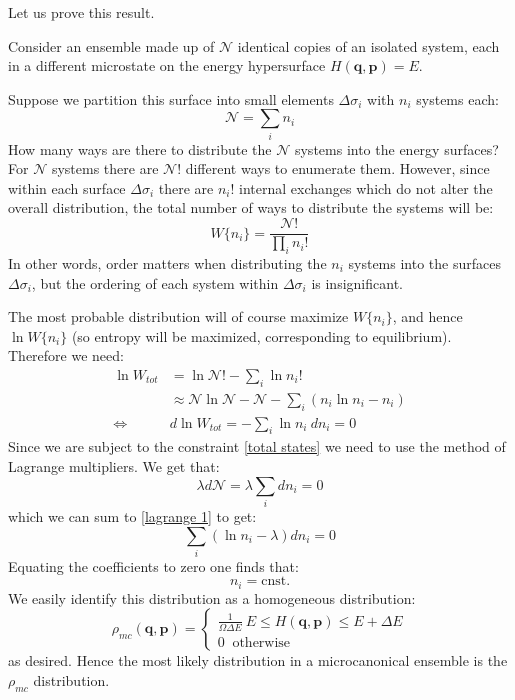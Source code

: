 \documentclass[a4paper,11pt,oneside]{book}
\begin{document}
Let us prove this result. 

Consider an ensemble made up of $\mathcal{N}$ identical copies of an isolated system, each in a different microstate on the energy hypersurface $H(\textbf{q},\textbf{p}) = E$.

Suppose we partition this surface into small elements $\Delta \sigma_i$ with $n_i$ systems each:
\begin{equation}\label{total states}
    \mathcal{N} = \sum_i n_i
\end{equation}
How many ways are there to distribute the $\mathcal{N}$ systems into the energy surfaces? For $\mathcal{N}$ systems there are $\mathcal{N}!$ different ways to enumerate them. However, since within each surface $\Delta \sigma_i$ there are $n_i!$ internal exchanges which do not alter the overall distribution, the total number of ways to distribute the systems will be:
\begin{equation}
    W\{n_i\} = \frac{\mathcal{N}!}{\prod_i n_i!}
\end{equation}
In other words, order matters when distributing the $n_i$ systems into the surfaces $\Delta \sigma_i$, but the ordering of each system within $\Delta \sigma_i$ is insignificant. 


The most probable distribution will of course maximize $W\{n_i\}$, and hence $\ln W\{n_i\}$ (so entropy will be maximized, corresponding to equilibrium). Therefore we need:
\begin{align}
    \ln W_{tot} &= \ln \mathcal{N}! -\sum_i  \ln n_i!\\
    &\approx \mathcal{N} \ln \mathcal{N} - \mathcal{N} - \sum_i (n_i\ln n_i-n_i) \label{gibbs deriv}\\
    \iff &d\ln W_{tot} = - \sum_{i} \ln n_i  \ dn_i = 0 \label{lagrange 1}
\end{align}
Since we are subject to the constraint \eqref{total states} we need to use the method of Lagrange multipliers. We get that:
\begin{equation}\label{lagrange2}
    \lambda d\mathcal{N} = \lambda \sum_i dn_i=0
\end{equation}
which we can sum to \eqref{lagrange 1} to get:
\begin{equation}
    \sum_{i} (\ln n_i-\lambda) dn_i = 0
\end{equation}
Equating the coefficients to zero one finds that:
\begin{equation}
   \boxed{ n_i = \text{cnst}.}
\end{equation}
We easily identify this distribution as a homogeneous distribution:
\begin{equation}
    \boxed{\rho_{mc}(\textbf{q},\textbf{p})=\begin{cases}
    \frac{1}{\Omega \Delta E} \ E\leq H(\textbf{q},\textbf{p}) \leq E+\Delta E \\
    0 \ \text{ otherwise}
    \end{cases}}
\end{equation}
as desired. Hence the most likely distribution in a microcanonical ensemble is the $\rho_{mc}$ distribution. 
\end{document}
